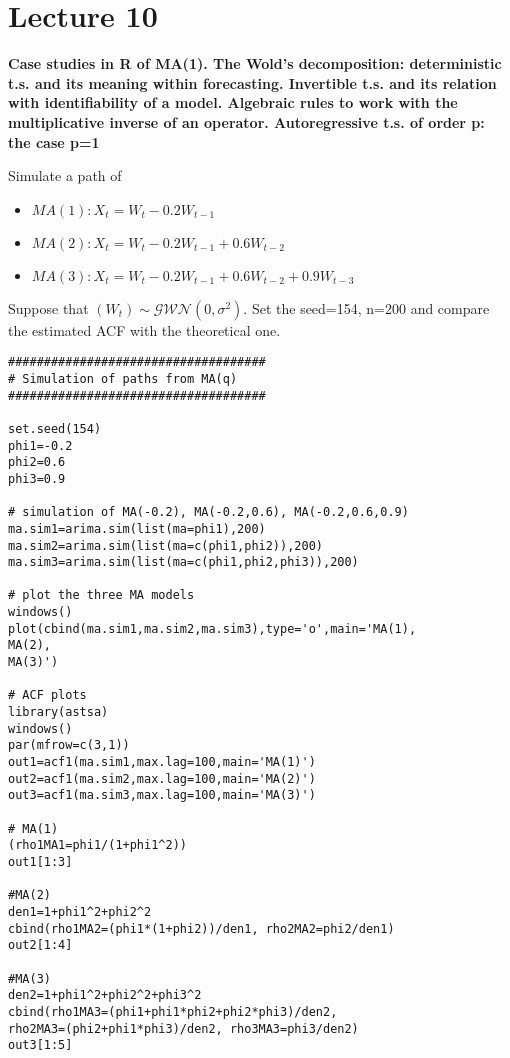 \section{Lecture 10}
\label{lecture10}

\begin{center}
    \textbf{Case studies in R of MA(1). The Wold's decomposition: deterministic t.s. and its meaning within forecasting. Invertible t.s. and its relation with identifiability of a model. Algebraic rules to work with the multiplicative inverse of an operator.  Autoregressive t.s. of order p: the case p=1}
\end{center}

\begin{example}
    Simulate a path of 
    \begin{itemize}
        \item $MA(1): X_t=W_t-0.2W_{t-1}$
        \item $MA(2): X_t=W_t-0.2W_{t-1}+0.6W_{t-2}$
        \item $MA(3): X_t=W_t-0.2W_{t-1}+0.6W_{t-2}+0.9W_{t-3}$
    \end{itemize}
    Suppose that $(W_t)\sim\mathcal{GWN}(0,\sigma^2)$. Set the seed=154, n=200 and compare the estimated ACF with the theoretical one.
    \begin{verbatim}
####################################
# Simulation of paths from MA(q)
####################################

set.seed(154)
phi1=-0.2
phi2=0.6
phi3=0.9

# simulation of MA(-0.2), MA(-0.2,0.6), MA(-0.2,0.6,0.9)
ma.sim1=arima.sim(list(ma=phi1),200)
ma.sim2=arima.sim(list(ma=c(phi1,phi2)),200)
ma.sim3=arima.sim(list(ma=c(phi1,phi2,phi3)),200)

# plot the three MA models
windows()
plot(cbind(ma.sim1,ma.sim2,ma.sim3),type='o',main='MA(1),
MA(2),
MA(3)')

# ACF plots
library(astsa)
windows()
par(mfrow=c(3,1))
out1=acf1(ma.sim1,max.lag=100,main='MA(1)')
out2=acf1(ma.sim2,max.lag=100,main='MA(2)')
out3=acf1(ma.sim3,max.lag=100,main='MA(3)')

# MA(1)
(rho1MA1=phi1/(1+phi1^2))
out1[1:3]

#MA(2)
den1=1+phi1^2+phi2^2
cbind(rho1MA2=(phi1*(1+phi2))/den1, rho2MA2=phi2/den1)
out2[1:4]

#MA(3)
den2=1+phi1^2+phi2^2+phi3^2
cbind(rho1MA3=(phi1+phi1*phi2+phi2*phi3)/den2, 
rho2MA3=(phi2+phi1*phi3)/den2, rho3MA3=phi3/den2)
out3[1:5]
    \end{verbatim}
\end{example}


